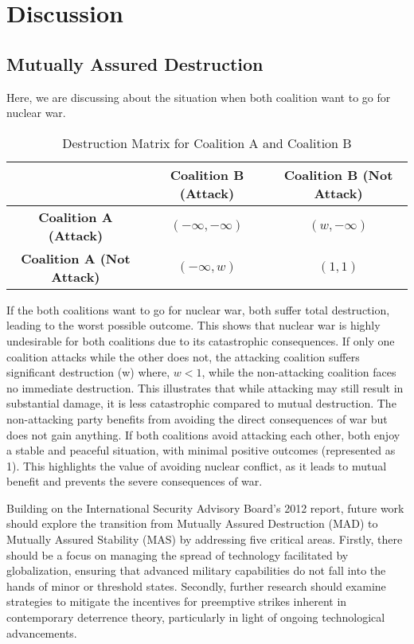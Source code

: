 \documentclass[oneside,12pt]{report}
\begin{document}
\chapter{Discussion}

\section{Mutually Assured Destruction}

Here, we are discussing about the situation when both coalition want to go for nuclear war.

\begin{table}[h!]
\centering
\begin{tabular}{c|c|c}
 & \textbf{Coalition B (Attack)} & \textbf{Coalition B (Not Attack)} \\
\hline
\textbf{Coalition A (Attack)} & $(-\infty, -\infty)$ & $(w, -\infty)$ \\
\hline
\textbf{Coalition A (Not Attack)} & $(-\infty, w)$ & $(1, 1)$ \\
\end{tabular}
\caption{Destruction Matrix for Coalition A and Coalition B}
\end{table}


If the both coalitions want to go for nuclear war, both suffer total destruction, leading to the worst possible outcome. This shows that nuclear war is highly undesirable for both coalitions due to its catastrophic consequences. If only one coalition attacks while the other does not, the attacking coalition suffers significant destruction (w) where, \( w < 1 \), while the non-attacking coalition faces no immediate destruction. This illustrates that while attacking may still result in substantial damage, it is less catastrophic compared to mutual destruction. The non-attacking party benefits from avoiding the direct consequences of war but does not gain anything. If both coalitions avoid attacking each other, both enjoy a stable and peaceful situation, with minimal positive outcomes (represented as 1). This highlights the value of avoiding nuclear conflict, as it leads to mutual benefit and prevents the severe consequences of war.

Building on the International Security Advisory Board's 2012 report, future work should explore the transition from Mutually Assured Destruction (MAD) to Mutually Assured Stability (MAS) by addressing five critical areas. Firstly, there should be a focus on managing the spread of technology facilitated by globalization, ensuring that advanced military capabilities do not fall into the hands of minor or threshold states. Secondly, further research should examine strategies to mitigate the incentives for preemptive strikes inherent in contemporary deterrence theory, particularly in light of ongoing technological advancements\cite{r4}.
\end{document}
